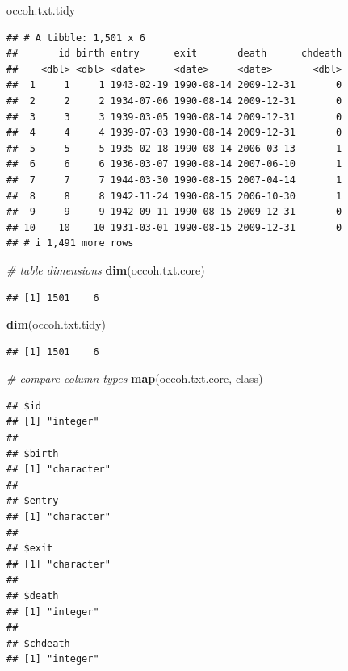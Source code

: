 \documentclass[
]{book}
\newenvironment{Shaded}{\begin{snugshade}}{\end{snugshade}}
\newcommand{\CommentTok}[1]{\textcolor[rgb]{0.56,0.35,0.01}{\textit{#1}}}
\newcommand{\FunctionTok}[1]{\textcolor[rgb]{0.13,0.29,0.53}{\textbf{#1}}}
\newcommand{\NormalTok}[1]{#1}
\begin{document}
\begin{Shaded}
\begin{Highlighting}[]
\NormalTok{occoh.txt.tidy}
\end{Highlighting}
\end{Shaded}

\begin{verbatim}
## # A tibble: 1,501 x 6
##       id birth entry      exit       death      chdeath
##    <dbl> <dbl> <date>     <date>     <date>       <dbl>
##  1     1     1 1943-02-19 1990-08-14 2009-12-31       0
##  2     2     2 1934-07-06 1990-08-14 2009-12-31       0
##  3     3     3 1939-03-05 1990-08-14 2009-12-31       0
##  4     4     4 1939-07-03 1990-08-14 2009-12-31       0
##  5     5     5 1935-02-18 1990-08-14 2006-03-13       1
##  6     6     6 1936-03-07 1990-08-14 2007-06-10       1
##  7     7     7 1944-03-30 1990-08-15 2007-04-14       1
##  8     8     8 1942-11-24 1990-08-15 2006-10-30       1
##  9     9     9 1942-09-11 1990-08-15 2009-12-31       0
## 10    10    10 1931-03-01 1990-08-15 2009-12-31       0
## # i 1,491 more rows
\end{verbatim}

\begin{Shaded}
\begin{Highlighting}[]
\CommentTok{\# table dimensions}
\FunctionTok{dim}\NormalTok{(occoh.txt.core)}
\end{Highlighting}
\end{Shaded}

\begin{verbatim}
## [1] 1501    6
\end{verbatim}

\begin{Shaded}
\begin{Highlighting}[]
\FunctionTok{dim}\NormalTok{(occoh.txt.tidy)}
\end{Highlighting}
\end{Shaded}

\begin{verbatim}
## [1] 1501    6
\end{verbatim}

\begin{Shaded}
\begin{Highlighting}[]
\CommentTok{\# compare column types}
\FunctionTok{map}\NormalTok{(occoh.txt.core, class)}
\end{Highlighting}
\end{Shaded}

\begin{verbatim}
## $id
## [1] "integer"
## 
## $birth
## [1] "character"
## 
## $entry
## [1] "character"
## 
## $exit
## [1] "character"
## 
## $death
## [1] "integer"
## 
## $chdeath
## [1] "integer"
\end{verbatim}
\end{document}
